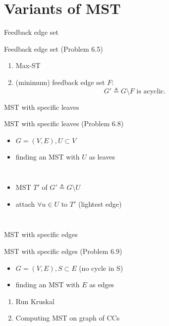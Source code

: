 \section{Variants of MST}

\begin{frame}{Feedback edge set}
  \begin{exampleblock}{Feedback edge set (Problem 6.5)}
    \begin{enumerate}
      \item Max-ST
      \item (minimum) feedback edge set $F$:
		\[
		  G' \triangleq G \setminus F \text{ is acyclic.}
		\]
    \end{enumerate}
  \end{exampleblock}
\end{frame}
\begin{frame}{MST with specific leaves}
  \begin{exampleblock}{MST with specific leaves (Problem 6.8)}
    \begin{itemize}
      \item $G = (V, E), U \subset V$
      \item finding an MST with $U$ as leaves
    \end{itemize}
  \end{exampleblock}

  \begin{columns}
	  \begin{itemize}
		\item MST $T'$ of $G' \triangleq G \setminus U$
		\item attach $\forall u \in U$ to $T'$ (lightest edge)
	  \end{itemize}
  \end{columns}
\end{frame}
\begin{frame}{MST with specific edges}
  \begin{exampleblock}{MST with specific edges (Problem 6.9)}
    \begin{itemize}
      \item $G = (V,E), S \subset E$ (no cycle in S)
      \item finding an MST with $E$ as edges
    \end{itemize}
  \end{exampleblock}

  \begin{enumerate}
	\item Run Kruskal
	\item Computing MST on graph of CCs
  \end{enumerate}
\end{frame}
